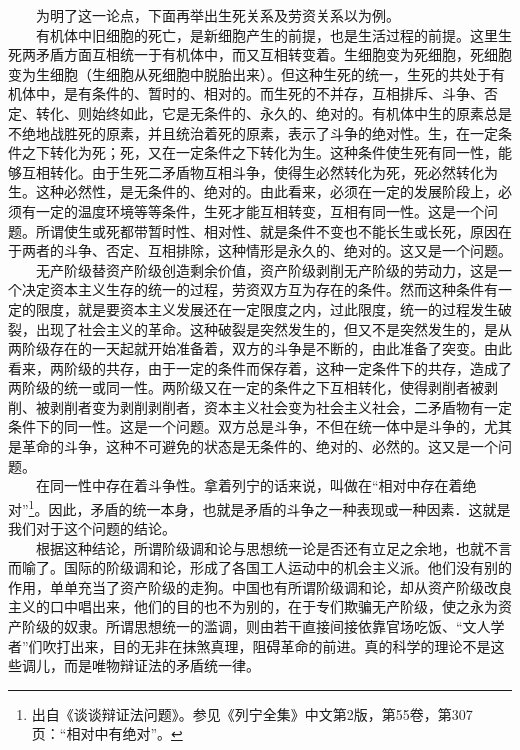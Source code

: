 \documentclass[cn,11pt,chinese]{elegantbook}
\begin{document}
　　为明了这一论点，下面再举出生死关系及劳资关系以为例。\\
　　有机体中旧细胞的死亡，是新细胞产生的前提，也是生活过程的前提。这里生死两矛盾方面互相统一于有机体中，而又互相转变着。生细胞变为死细胞，死细胞变为生细胞（生细胞从死细胞中脱胎出来）。但这种生死的统一，生死的共处于有机体中，是有条件的、暂时的、相对的。而生死的不并存，互相排斥、斗争、否定、转化、则始终如此，它是无条件的、永久的、绝对的。有机体中生的原素总是不绝地战胜死的原素，并且统治着死的原素，表示了斗争的绝对性。生，在一定条件之下转化为死；死，又在一定条件之下转化为生。这种条件使生死有同一性，能够互相转化。由于生死二矛盾物互相斗争，使得生必然转化为死，死必然转化为生。这种必然性，是无条件的、绝对的。由此看来，必须在一定的发展阶段上，必须有一定的温度环境等等条件，生死才能互相转变，互相有同一性。这是一个问题。所谓使生或死都带暂时性、相对性、就是条件不变也不能长生或长死，原因在于两者的斗争、否定、互相排除，这种情形是永久的、绝对的。这又是一个问题。\\
　　无产阶级替资产阶级创造剩余价值，资产阶级剥削无产阶级的劳动力，这是一个决定资本主义生存的统一的过程，劳资双方互为存在的条件。然而这种条件有一定的限度，就是要资本主义发展还在一定限度之内，过此限度，统一的过程发生破裂，出现了社会主义的革命。这种破裂是突然发生的，但又不是突然发生的，是从两阶级存在的一天起就开始准备着，双方的斗争是不断的，由此准备了突变。由此看来，两阶级的共存，由于一定的条件而保存着，这种一定条件下的共存，造成了两阶级的统一或同一性。两阶级又在一定的条件之下互相转化，使得剥削者被剥削、被剥削者变为剥削剥削者，资本主义社会变为社会主义社会，二矛盾物有一定条件下的同一性。这是一个问题。双方总是斗争，不但在统一体中是斗争的，尤其是革命的斗争，这种不可避免的状态是无条件的、绝对的、必然的。这又是一个问题。\\
　　在同一性中存在着斗争性。拿着列宁的话来说，叫做在“相对中存在着绝对”\footnote[14]{ 出自《谈谈辩证法问题》。参见《列宁全集》中文第2版，第55卷，第307页：“相对中有绝对”。}。因此，矛盾的统一本身，也就是矛盾的斗争之一种表现或一种因素．这就是我们对于这个问题的结论。\\
　　根据这种结论，所谓阶级调和论与思想统一论是否还有立足之余地，也就不言而喻了。国际的阶级调和论，形成了各国工人运动中的机会主义派。他们没有别的作用，单单充当了资产阶级的走狗。中国也有所谓阶级调和论，却从资产阶级改良主义的口中唱出来，他们的目的也不为别的，在于专们欺骗无产阶级，使之永为资产阶级的奴隶。所谓思想统一的滥调，则由若干直接间接依靠官场吃饭、“文人学者”们吹打出来，目的无非在抹煞真理，阻碍革命的前进。真的科学的理论不是这些调儿，而是唯物辩证法的矛盾统一律。\\
\end{document}
